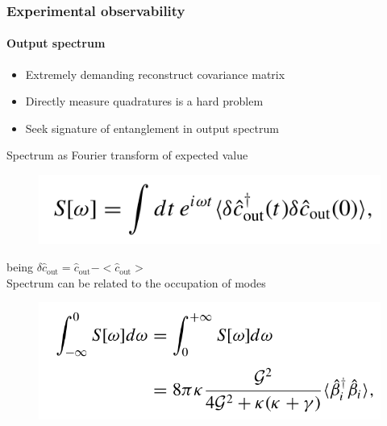\documentclass[aspectratio=43]{beamer}
\begin{document}
\begin{frame}
	
	\frametitle{Experimental observability}
	\framesubtitle{Output spectrum}
	
	\begin{itemize}
		\item Extremely demanding reconstruct covariance matrix
		\item Directly measure quadratures is a hard problem
		\item Seek signature of entanglement in output spectrum
	\end{itemize}

	Spectrum as Fourier transform of expected value	
	\begin{figure}
		\includegraphics[width = 6 cm]{plots/spectrum_fourier.png}
	\end{figure}	

	being $\delta \hat{c}_{\textrm{out}} = \hat{c}_{\textrm{out}} - <\hat{c}_{\textrm{out}}>$ \\
	Spectrum can be related to the occupation of modes
	\begin{figure}
		\includegraphics[width = 6.5 cm]{plots/spectrum.png}
	\end{figure}	

\end{frame}
\end{document}

